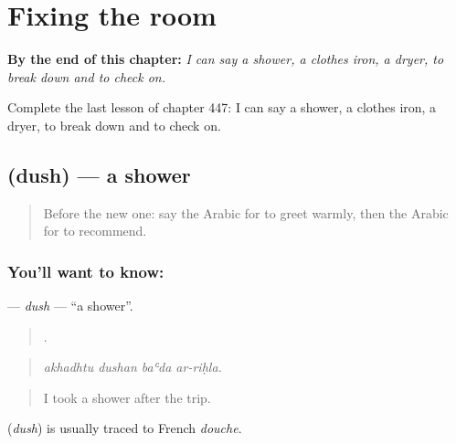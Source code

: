 
\chapter{Fixing the room}
\label{ch:ar-fixing-the-room}

\begin{chapteropening}
\textbf{By the end of this chapter:} \emph{I can say a shower, a clothes iron, a dryer, to break down and to check on.}

Complete the last lesson of chapter 447: I can say a shower, a clothes iron, a dryer, to break down and to check on.
\end{chapteropening}

\section[\texorpdfstring{\ar{دش} (dush)}{دش (dush)}]{ (dush) — a shower}

\label{lesson:AR-C447-dush}



\begin{quote}
Before the new one: say the Arabic for to greet warmly, then the Arabic for to recommend.
\end{quote}

\subsection*{You'll want to know: }
\textbf{} — \emph{dush} — \textquotedblleft{}a shower\textquotedblright{}.

\begin{quote}
   .
\end{quote}

\begin{quote}
\emph{akhadhtu dushan baʿda ar-riḥla.}
\end{quote}

\begin{quote}
I took a shower after the trip.
\end{quote}

\begin{cousinweb}
\textbf{} (\emph{dush}) is usually traced to French \emph{douche}.
\end{cousinweb}

